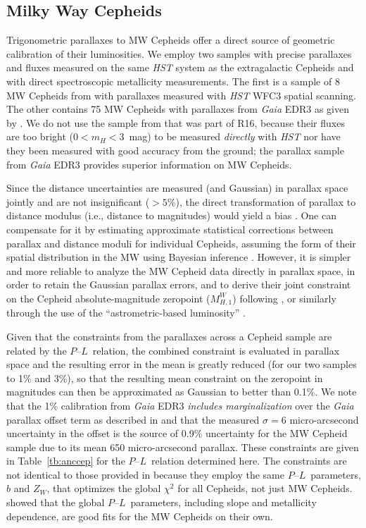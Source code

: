 \documentclass[12pt]{aastex631}
\newcommand{\PLs}{$P$--$L$\ }
\begin{document}
\subsection{Milky Way Cepheids\label{sc:4.1}}
    
Trigonometric parallaxes to MW Cepheids offer a direct source of geometric calibration of their luminosities. We employ two samples with precise parallaxes and fluxes measured on the same  {\it HST}  system as the extragalactic Cepheids and with direct spectroscopic metallicity measurements.  The first is a sample of 8 MW Cepheids from \cite{Riess:2018b} with parallaxes measured with  {\it HST}  WFC3 spatial scanning.   The other contains 75 MW Cepheids with parallaxes from {\it Gaia} EDR3 as given by \citet{Riess:2021}. We do not use the sample from \citet{benedict07} that was part of R16, because their fluxes are too bright ($0\!<\!m_H\!<\!3$~mag) to be measured {\it directly} with {\it HST} nor have they been measured with good accuracy from the ground; the parallax sample from {\it Gaia} EDR3 provides superior information on MW Cepheids.

Since the distance uncertainties are measured (and Gaussian) in parallax space jointly and are not insignificant ($>5$\%), the direct transformation of parallax to distance modulus (i.e., distance to magnitudes) would yield a bias  \citep[often called the ``Lutz-Kelker'' bias, following][]{lutz73}. One can compensate for it by estimating approximate statistical corrections between parallax and distance moduli for individual Cepheids, assuming the form of their spatial distribution in the MW using Bayesian inference \citep{Bailer-Jones:2021}. However, it is simpler and more reliable to analyze the MW Cepheid data directly in parallax space, in order to retain the Gaussian parallax errors, and to derive their joint constraint on the Cepheid absolute-magnitude zeropoint ($M^W_{H,1}$) following  \citet{Riess:2021}, or similarly through the use of the ``astrometric-based luminosity''  \citep{Arenou:1999}. 

Given that the constraints from the parallaxes across a Cepheid sample are related by the \PLs relation, the combined constraint is evaluated in parallax space and the resulting error in the mean is greatly reduced (for our two samples to 1\% and 3\%), so that the resulting mean constraint on the zeropoint in magnitudes can then be approximated as Gaussian to better than 0.1\%.  We note that the 1\% calibration from {\it Gaia} EDR3 {\it includes marginalization} over the {\it Gaia} parallax offset term as described in \citet{Riess:2021} and that the measured $\sigma=6$ micro-arcsecond uncertainty in the offset is the source of 0.9\% uncertainty for the MW Cepheid sample due to its mean 650  micro-arcsecond parallax. These constraints are given in Table~\ref{tb:anccep} for the \PLs relation determined here. The constraints are not identical to those provided in \citet{Riess:2021} because they employ the same \PLs parameters, $b$ and $Z_W$, that optimizes the global $\chi^2$ for all Cepheids, not just MW Cepheids.  \cite{Riess:2021} showed that the global \PLs parameters, including slope and metallicity dependence, are good fits for the MW Cepheids on their own.
\end{document}
